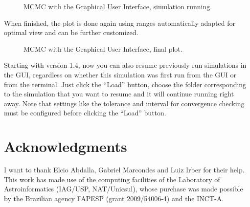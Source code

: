 \documentclass[letterpaper,12pt,english]{sphinxhowto}
\begin{document}
\begin{figure}[!tb]
\centering
\capstart

\noindent{}
\caption{MCMC with the Graphical User Interface, simulation running.}\label{\detokenize{GUIMCMC:id2}}\end{figure}

When finished, the plot is done again using ranges automatically adapted for
optimal view and can be further customized.

\begin{figure}[!tb]
\centering
\capstart

\noindent{}
\caption{MCMC with the Graphical User Interface, final plot.}\label{\detokenize{GUIMCMC:id3}}\end{figure}

Starting with version 1.4, now you can also resume previously run simulations
in the GUI, regardless on whether this simulation was first run from the GUI or
from the terminal.
Just click the “Load” button, choose the folder corresponding to the simulation
that you want to resume and it will continue running right away.
Note that settings like the tolerance and interval for convergence checking
must be configured before clicking the “Load” button.


\section{Acknowledgments}
\label{\detokenize{acknowledgments::doc}}\label{\detokenize{acknowledgments:acknowledgments}}
I want to thank Elcio Abdalla, Gabriel Marcondes and Luiz Irber for their help.
This work has made use of the computing facilities of the Laboratory of
Astroinformatics (IAG/USP, NAT/Unicsul), whose purchase was made possible by
the Brazilian agency FAPESP (grant 2009/54006-4) and the INCT-A.



\renewcommand{\indexname}{Index}
\printindex
\end{document}
